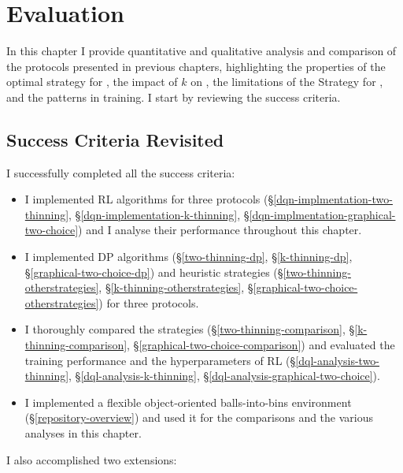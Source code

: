 \chapter{Evaluation}\label{evaluation}


\ifpdf
    \graphicspath{{Chapter3/Figs/Raster/}{Chapter3/Figs/PDF/}{Chapter3/Figs/}}
\else
    \graphicspath{{Chapter3/Figs/Vector/}{Chapter3/Figs/}}
\fi


In this chapter I provide quantitative and qualitative analysis and comparison of the protocols presented in previous chapters, highlighting the properties of the optimal \DP strategy for \TwoThinning, the impact of $k$ on \KThinning, the limitations of the \Greedy Strategy for \GraphicalTwoChoice, and the patterns in \DQL training. I start by reviewing the success criteria.


\section{Success Criteria Revisited}

I successfully completed all the success criteria:

\begin{itemize}
    \item 
    I implemented \DQL RL algorithms for three protocols (\S\ref{dqn-implmentation-two-thinning}, \S\ref{dqn-implementation-k-thinning}, \S\ref{dqn-implmentation-graphical-two-choice}) and I analyse their performance throughout this chapter.
    \item
    I implemented DP algorithms (\S\ref{two-thinning-dp}, \S\ref{k-thinning-dp}, \S\ref{graphical-two-choice-dp}) and heuristic strategies (\S\ref{two-thinning-otherstrategies}, \S\ref{k-thinning-otherstrategies}, \S\ref{graphical-two-choice-otherstrategies}) for three protocols.
    \item
    I thoroughly compared the strategies (\S\ref{two-thinning-comparison}, \S\ref{k-thinning-comparison}, \S\ref{graphical-two-choice-comparison}) and evaluated the training performance and the hyperparameters of RL (\S\ref{dql-analysis-two-thinning}, \S\ref{dql-analysis-k-thinning}, \S\ref{dql-analysis-graphical-two-choice}).
    \item
    I implemented a flexible object-oriented balls-into-bins environment (\S\ref{repository-overview}) and used it for the comparisons and the various analyses in this chapter.
\end{itemize}


I also accomplished two extensions:



